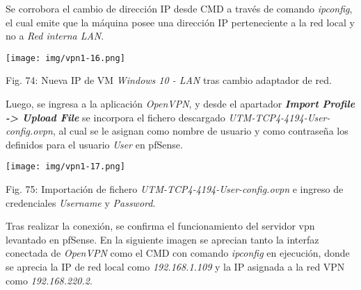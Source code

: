 \documentclass[12pt,oneside,a4paper]{book}
\begin{document}
\vspace{2em}

\hspace{20pt}
Se corrobora el cambio de dirección IP desde CMD a través de comando \textit{ipconfig}, el cual emite que la máquina posee una dirección IP perteneciente a la red local y no a \textit{Red interna LAN}.

\vspace{2em}

\begin{center}
    \texttt{[image: img/vpn1-16.png]}
    
\vspace{0.1em}
    
    Fig. 74: Nueva IP de VM \textit{Windows 10 - LAN} tras cambio adaptador de red.
\end{center}

\vspace{2em}

\hspace{20pt}
Luego, se ingresa a la aplicación \textit{OpenVPN}, y desde el apartador \textbf{\textit{Import Profile -> Upload File}} se incorpora el fichero descargado \textit{UTM-TCP4-4194-User-config.ovpn}, al cual se le asignan como nombre de usuario y como contraseña los definidos para el usuario \textit{User} en pfSense.

\vspace{2em}

\begin{center}
    \texttt{[image: img/vpn1-17.png]}
    
\vspace{0.1em}
    
    Fig. 75: Importación de fichero \textit{UTM-TCP4-4194-User-config.ovpn} e ingreso de credenciales \textit{Username} y \textit{Password}.
\end{center}

\vspace{2em}

\hspace{20pt}
Tras realizar la conexión, se confirma el funcionamiento del servidor vpn levantado en pfSense. En la siguiente imagen se aprecian tanto la interfaz conectada de \textit{OpenVPN} como el CMD con comando \textit{ipconfig} en ejecución, donde se aprecia la IP de red local como \textit{192.168.1.109} y la IP asignada a la red VPN como \textit{192.168.220.2}.

\vspace{2em}
\end{document}
